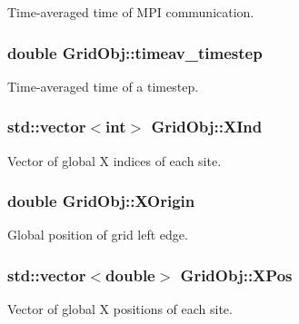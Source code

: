 Time-\/averaged time of M\+PI communication. 

\subsubsection[{\texorpdfstring{timeav\+\_\+timestep}{timeav_timestep}}]{\setlength{\rightskip}{0pt plus 5cm}double Grid\+Obj\+::timeav\+\_\+timestep}\hypertarget{class_grid_obj_a2ad670e6b9bdd28b5060397800170310}{}\label{class_grid_obj_a2ad670e6b9bdd28b5060397800170310}


Time-\/averaged time of a timestep. 

\subsubsection[{\texorpdfstring{X\+Ind}{XInd}}]{\setlength{\rightskip}{0pt plus 5cm}std\+::vector$<$int$>$ Grid\+Obj\+::\+X\+Ind}\hypertarget{class_grid_obj_ad9bb2153aec972c499ce969a76d908fd}{}\label{class_grid_obj_ad9bb2153aec972c499ce969a76d908fd}


Vector of global X indices of each site. 

\subsubsection[{\texorpdfstring{X\+Origin}{XOrigin}}]{\setlength{\rightskip}{0pt plus 5cm}double Grid\+Obj\+::\+X\+Origin}\hypertarget{class_grid_obj_adcd2bcbd5bb4009d7c84097e1356a1fa}{}\label{class_grid_obj_adcd2bcbd5bb4009d7c84097e1356a1fa}


Global position of grid left edge. 

\subsubsection[{\texorpdfstring{X\+Pos}{XPos}}]{\setlength{\rightskip}{0pt plus 5cm}std\+::vector$<$double$>$ Grid\+Obj\+::\+X\+Pos}\hypertarget{class_grid_obj_af31df133bf9419da6222a0dbb4e54bab}{}\label{class_grid_obj_af31df133bf9419da6222a0dbb4e54bab}


Vector of global X positions of each site. 

